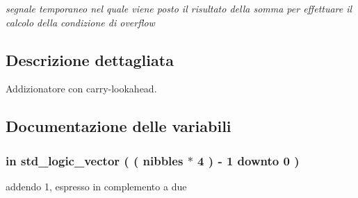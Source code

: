 \begin{DoxyCompactItemize}
\begin{DoxyCompactList}\small\item\em segnale temporaneo nel quale viene posto il risultato della somma per effettuare il calcolo della condizione di overflow \end{DoxyCompactList}\end{DoxyCompactItemize}


\subsection{Descrizione dettagliata}
Addizionatore con carry-\/lookahead. 



\subsection{Documentazione delle variabili}
\hypertarget{group___carry_loockahead_gae4a2e124144a2f35270a55f0cf32a5ee}{
\subsubsection[{addendum1}]{ {\bfseries \textcolor{vhdlchar}{in}\textcolor{vhdlchar}{ }} {\bfseries \textcolor{vhdlchar}{std\+\_\+logic\+\_\+vector}\textcolor{vhdlchar}{ }\textcolor{vhdlchar}{(}\textcolor{vhdlchar}{ }\textcolor{vhdlchar}{(}\textcolor{vhdlchar}{ }\textcolor{vhdlchar}{ }\textcolor{vhdlchar}{ }\textcolor{vhdlchar}{ }{\bfseries {\bf nibbles}} \textcolor{vhdlchar}{$\ast$}\textcolor{vhdlchar}{ } \textcolor{vhdldigit}{4} \textcolor{vhdlchar}{ }\textcolor{vhdlchar}{)}\textcolor{vhdlchar}{ }\textcolor{vhdlchar}{-\/}\textcolor{vhdlchar}{ } \textcolor{vhdldigit}{1} \textcolor{vhdlchar}{ }\textcolor{vhdlchar}{downto}\textcolor{vhdlchar}{ }\textcolor{vhdlchar}{ } \textcolor{vhdldigit}{0} \textcolor{vhdlchar}{ }\textcolor{vhdlchar}{)}\textcolor{vhdlchar}{ }} \hspace{0.3cm}{\ttfamily [Port]}}}\label{group___carry_loockahead_gae4a2e124144a2f35270a55f0cf32a5ee}


addendo 1, espresso in complemento a due 

